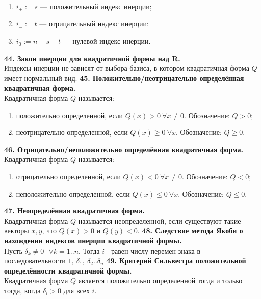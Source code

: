 \documentclass{article}
\begin{document}
\begin{enumerate}
\item $i_+ := s$ --- положительный индекс инерции;
\item $i_- := t$ --- отрицательный индекс инерции;
\item $i_0 := n - s - t$ --- нулевой индекс инерции.
\end{enumerate}
\textbf{44. Закон инерции для квадратичной формы над R.}\\
Индексы инерции не зависят от выбора базиса, в котором квадратичная форма $Q$ имеет нормальный вид.
\newline
\newline
\textbf{45. Положительно/неотрицательно определённая квадратичная форма.}\\
Квадратичная форма $Q$ называется:
\begin{enumerate}
\item положительно определенной, если $Q(x) > 0\ \forall x \neq 0$. Обозначение: $Q > 0$;
\item неотрицательно определенной, если $Q(x) \geqslant 0\ \forall x$. Обозначение: $Q \geqslant 0$.
\end{enumerate}
\textbf{46. Отрицательно/неположительно определённая квадратичная форма.}\\
Квадратичная форма $Q$ называется:
\begin{enumerate}
\item отрицательно определенной, если $Q(x) < 0\  \forall x \neq 0$. Обозначение: $Q < 0$;
\item неположительно определенной, если $Q(x) \leqslant 0\ \forall x$. Обозначение: $Q \leqslant 0$.
\end{enumerate}
\textbf{47. Неопределённая квадратичная форма.}\\
Квадратичная форма $Q$ называется неопределенной, если существуют такие векторы $x, y$, что $Q(x) > 0$ и $Q(y) < 0$.
\newline
\newline
\textbf{48. Следствие метода Якоби о нахождении индексов инерции квадратичной формы.}\\
Пусть $\delta_k\neq0 ~~~\forall k=1..n$. Тогда $i_-$ равен числу перемен знака в последовательности $1,~\delta_1,~\delta_2..\delta_n$ 
\newline
\newline
\textbf{49. Критерий Сильвестра положительной определённости квадратичной формы.}\\
Квадратичная форма $Q$ является положительно определенной тогда и только тогда, когда $\delta_i > 0$  для всех $i$.
\end{document}
